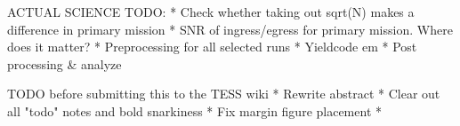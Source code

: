 ACTUAL SCIENCE TODO:
* Check whether taking out sqrt(N) makes a difference in primary mission
* SNR of ingress/egress for primary mission. Where does it matter?
* Preprocessing for all selected runs
* Yieldcode em
* Post processing & analyze


TODO before submitting this to the TESS wiki
* Rewrite abstract
* Clear out all "todo" notes and bold snarkiness
* Fix margin figure placement
* 

